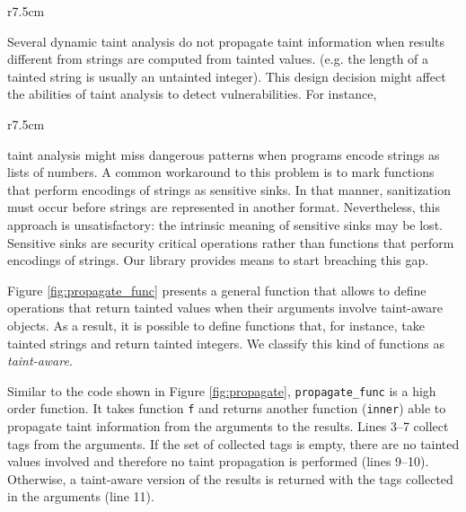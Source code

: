\documentclass[oribibl]{llncs}
\newcommand{\nameTklass}{Taint-aware }
\begin{document}
\begin{wrapfigure}{r}{7.5cm}
\vspace{-30pt}
{\small{

\vspace{-5pt}
\caption{\label{fig:propagate_func} Propagation of taint information among
  possibly different taint-aware objects}
}}
\end{wrapfigure}
Several dynamic taint analysis
\cite{Perl,Nguyen05,Jovanovic06pixy:a,KozlovPetukhov07,Futo07,SeoLam2010}
do not propagate taint information when results 
different from strings are computed from tainted values. 
(e.g. the length of a tainted string is usually an untainted
integer). This design decision might affect the abilities of taint
analysis to detect vulnerabilities. For instance, 
\begin{wrapfigure}{r}{7.5cm}
\vspace{-25pt}
{\small{

\vspace{-5pt}
\caption{\label{fig:propagate_func:example} \nameTklass
  functions for strings and integers}
}}
\vspace{-20pt}
\end{wrapfigure}
taint analysis might miss dangerous patterns when 
programs encode strings as lists of numbers. 
A common workaround to this problem is to 
mark functions that perform
encodings of strings as sensitive sinks. In that manner, 
sanitization must occur before strings are represented in another
format. 
Nevertheless, this approach 
is unsatisfactory: the intrinsic meaning of sensitive sinks may be
lost. Sensitive sinks are security critical operations rather than 
functions that perform encodings of strings.
Our library provides means
to start breaching this gap. 

Figure \ref{fig:propagate_func} presents a general function that allows to define 
operations that return tainted values when their arguments 
involve taint-aware objects. As a result, it is possible
to define functions that, for instance, take tainted strings and 
return tainted integers. We classify this kind of functions 
as \emph{taint-aware}. 

Similar to the code shown in 
Figure \ref{fig:propagate}, \texttt{propagate\_func} is a high order
function. It takes function \texttt{f} 
and returns another function (\texttt{inner}) able to propagate 
taint information from the arguments
to the results.  Lines 3--7 collect tags 
from the arguments. If the set of
collected tags is empty, there are no tainted
values involved and therefore no taint propagation is 
performed (lines 9--10). Otherwise, 
a taint-aware version of the results is returned with 
the tags collected in the arguments (line 11). 
 
\end{document}
